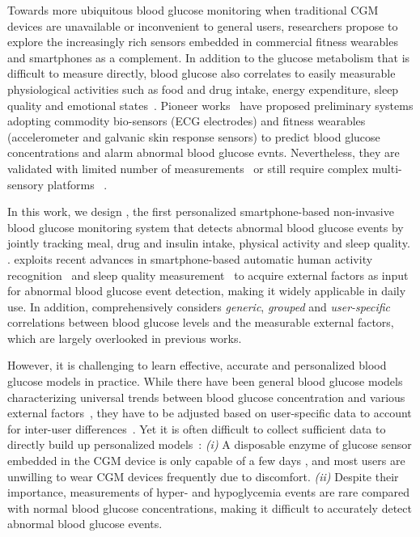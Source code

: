 Towards more ubiquitous blood glucose monitoring when traditional CGM devices are unavailable or inconvenient to general users, researchers propose to explore the increasingly rich sensors embedded in commercial fitness wearables and smartphones as a complement.
In addition to the glucose metabolism that is difficult to measure directly, blood glucose also correlates to easily measurable physiological activities such as food and drug intake, energy expenditure, sleep quality and emotional states~\cite{bib:DRCP15:Iwasaki}.
Pioneer works~\cite{bib:EMBC12:Nguyen} \cite{bib:SEMPER16:Ranvier} \cite{bib:JDST14:Sobel} have proposed preliminary systems adopting commodity bio-sensors (\eg ECG electrodes) and fitness wearables (\eg accelerometer and galvanic skin response sensors) to predict blood glucose concentrations and alarm abnormal blood glucose evnts.
Nevertheless, they are validated with limited number of measurements~\cite{bib:SEMPER16:Ranvier} \cite{bib:JDST14:Sobel} or still require complex multi-sensory platforms~\cite{bib:EMBC12:Nguyen} \cite{bib:JDST14:Sobel}.

In this work, we design \sysname, the first personalized smartphone-based non-invasive blood glucose monitoring system that detects abnormal blood glucose events by jointly tracking meal, drug and insulin intake, physical activity and sleep quality.
.
\sysname exploits recent advances in smartphone-based automatic human activity recognition~\cite{bib:KDDEN11:Kwapisz} and sleep quality measurement~\cite{bib:UbiComp14:Gu} to acquire external factors as input for abnormal blood glucose event detection, making it widely applicable in daily use.
In addition, \sysname comprehensively considers \emph{generic}, \emph{grouped}  and \emph{user-specific} correlations between blood glucose levels and the measurable external factors, which are largely overlooked in previous works.

However, it is challenging to learn effective, accurate and personalized blood glucose models in practice.
While there have been general blood glucose models characterizing universal trends between blood glucose concentration and various external factors~\cite{bib:IJNMBE16:Oviedo}, they have to be adjusted based on user-specific data to account for inter-user differences~\cite{bib:ICMLA13:Bunescu}.
Yet it is often difficult to collect sufficient data to directly build up personalized models~\cite{bib:KDHealth16:Marling}:
\emph{(i)}
A disposable enzyme of glucose sensor embedded in the CGM device is only capable of a few days \cite{bib:CGM_wiki} \cite{bib:CGM_wave}, and most users are unwilling to wear CGM devices frequently due to discomfort.
\emph{(ii)}
Despite their importance, measurements of hyper- and hypoglycemia events are rare compared with normal blood glucose concentrations, making it difficult to accurately detect abnormal blood glucose events.

